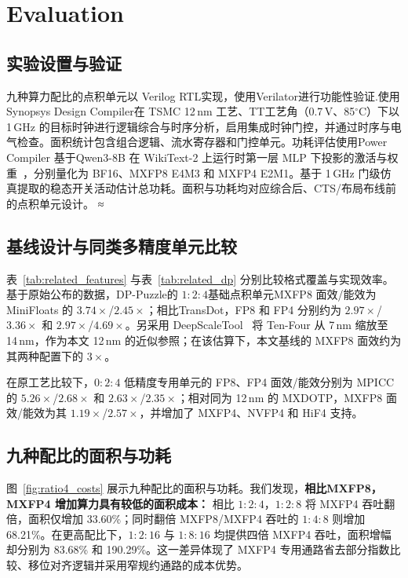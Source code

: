 \section{Evaluation }
\label{sec:evaluation}

\subsection{实验设置与验证}
\label{sec:eval_setup}
\label{sec:numerical_validation}

九种算力配比的点积单元以 Verilog RTL实现，使用Verilator进行功能性验证.使用 Synopsys Design Compiler在 TSMC 12\,nm 工艺、TT工艺角（0.7\,V、85$^\circ$C）下以 1\,GHz 的目标时钟进行逻辑综合与时序分析，启用集成时钟门控，并通过时序与电气检查。面积统计包含组合逻辑、流水寄存器和门控单元。功耗评估使用Power Compiler 基于Qwen3-8B 在 WikiText-2 上运行时第一层 MLP 下投影的激活与权重~\cite{qwen3technicalreport,merity2016pointer}，分别量化为 BF16、MXFP8 E4M3 和 MXFP4 E2M1。基于 1\,GHz 门级仿真提取的稳态开关活动估计总功耗。面积与功耗均对应综合后、CTS/布局布线前的点积单元设计。
≈
\subsection{基线设计与同类多精度单元比较}
\label{sec:related_dp_evaluation}



表~\ref{tab:related_features} 与表~\ref{tab:related_dp} 分别比较格式覆盖与实现效率。基于原始公布的数据，DP-Puzzle的 $1:2:4$基础点积单元MXFP8 面效/能效为 MiniFloats 的 $3.74\times$/$2.45\times$；相比TransDot，FP8 和 FP4 分别约为 $2.97\times$/$3.36\times$ 和 $2.97\times$/$4.69\times$。另采用 DeepScaleTool~\cite{sarangi2021deepscaletool} 将 Ten-Four 从 7\,nm 缩放至 14\,nm，作为本文 12\,nm 的近似参照；在该估算下，本文基线的 MXFP8 面效约为其两种配置下的 $3\times$。

在原工艺比较下，$0:2:4$ 低精度专用单元的 FP8、FP4 面效/能效分别为 MPICC 的 $5.26\times$/$2.68\times$ 和 $2.63\times$/$2.35\times$；相对同为 12\,nm 的 MXDOTP，MXFP8 面效/能效为其 $1.19\times$/$2.57\times$，并增加了 MXFP4、NVFP4 和 HiF4 支持。

\subsection{九种配比的面积与功耗}
\label{sec:lowp_costs}

图~\ref{fig:ratio4_costs} 展示九种配比的面积与功耗。我们发现，\textbf{相比MXFP8，MXFP4 增加算力具有较低的面积成本：} 相比 $1:2:4$，$1:2:8$ 将 MXFP4 吞吐翻倍，面积仅增加 33.60\%；同时翻倍 MXFP8/MXFP4 吞吐的 $1:4:8$ 则增加 68.21\%。在更高配比下，$1:2:16$ 与 $1:8:16$ 均提供四倍 MXFP4 吞吐，面积增幅却分别为 83.68\% 和 190.29\%。这一差异体现了 MXFP4 专用通路省去部分指数比较、移位对齐逻辑并采用窄规约通路的成本优势。

